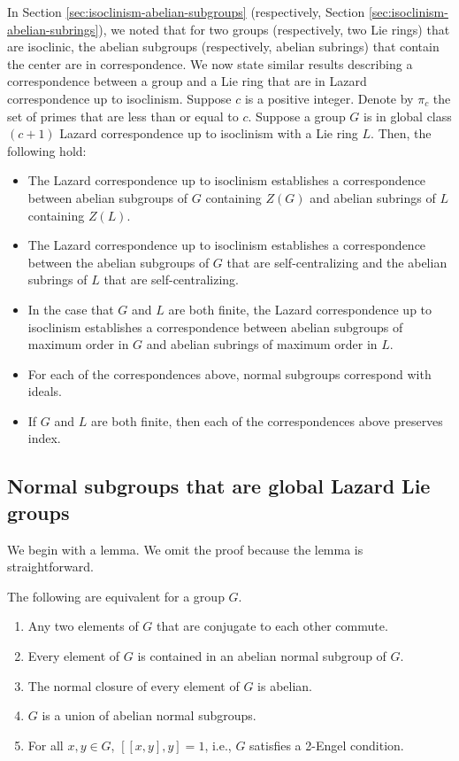 In Section \ref{sec:isoclinism-abelian-subgroups} (respectively,
Section \ref{sec:isoclinism-abelian-subrings}), we noted that for two
groups (respectively, two Lie rings) that are isoclinic, the abelian
subgroups (respectively, abelian subrings) that contain the center are
in correspondence. We now state similar results describing a
correspondence between a group and a Lie ring that are in Lazard
correspondence up to isoclinism. Suppose $c$ is a positive
integer. Denote by $\pi_c$ the set of primes that are less than or
equal to $c$. Suppose a group $G$ is in global class $(c + 1)$ Lazard
correspondence up to isoclinism with a Lie ring $L$. Then, the
following hold:

\begin{itemize}
\item The Lazard correspondence up to isoclinism establishes a
  correspondence between abelian subgroups of $G$ containing $Z(G)$
  and abelian subrings of $L$ containing $Z(L)$.
\item The Lazard correspondence up to isoclinism establishes a
  correspondence between the abelian subgroups of $G$ that are
  self-centralizing and the abelian subrings of $L$ that are
  self-centralizing.
\item In the case that $G$ and $L$ are both finite, the Lazard
  correspondence up to isoclinism establishes a correspondence between
  abelian subgroups of maximum order in $G$ and abelian subrings of
  maximum order in $L$.
\item For each of the correspondences above, normal subgroups
  correspond with ideals.
\item If $G$ and $L$ are both finite, then each of the correspondences
  above preserves index.
\end{itemize}

\subsection{Normal subgroups that are global Lazard Lie groups}

We begin with a lemma. We omit the proof because the lemma is
straightforward.

\begin{lemma}
  The following are equivalent for a group $G$.

  \begin{enumerate}
  \item Any two elements of $G$ that are conjugate to each other
    commute.
  \item Every element of $G$ is contained in an abelian normal
    subgroup of $G$.
  \item The normal closure of every element of $G$ is abelian.
  \item $G$ is a union of abelian normal subgroups.
  \item For all $x,y \in G$, $[[x,y],y] = 1$, i.e., $G$ satisfies a
    2-Engel condition.
  \end{enumerate}
\end{lemma}

